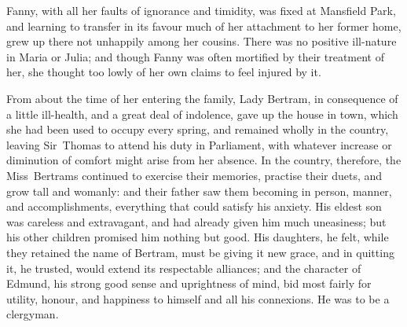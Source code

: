Fanny, with all her faults of ignorance and timidity, was fixed at Mansfield Park, and learning to transfer in its favour much of her attachment to her former home, grew up there not unhappily among her cousins. There was no positive ill-nature in Maria or Julia; and though Fanny was often mortified by their treatment of her, she thought too lowly of her own claims to feel injured by it.

From about the time of her entering the family, Lady Bertram, in consequence of a little ill-health, and a great deal of indolence, gave up the house in town, which she had been used to occupy every spring, and remained wholly in the country, leaving Sir~Thomas to attend his duty in Parliament, with whatever increase or diminution of comfort might arise from her absence. In the country, therefore, the Miss~Bertrams continued to exercise their memories, practise their duets, and grow tall and womanly: and their father saw them becoming in person, manner, and accomplishments, everything that could satisfy his anxiety. His eldest son was careless and extravagant, and had already given him much uneasiness; but his other children promised him nothing but good. His daughters, he felt, while they retained the name of Bertram, must be giving it new grace, and in quitting it, he trusted, would extend its respectable alliances; and the character of Edmund, his strong good sense and uprightness of mind, bid most fairly for utility, honour, and happiness to himself and all his connexions. He was to be a clergyman.

